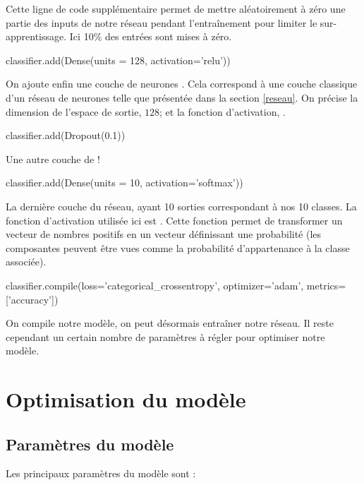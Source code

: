 Cette ligne de code supplémentaire permet de mettre aléatoirement à zéro une partie des 
inputs de notre réseau pendant l'entraînement pour limiter le sur-apprentissage. Ici 10\%
des entrées sont mises à zéro.

\begin{codeblock}
classifier.add(Dense(units = 128, activation='relu'))
\end{codeblock}

On ajoute enfin une couche de neurones . 
Cela correspond à une couche classique d'un réseau de neurones telle que présentée 
dans la section \ref{reseau}. 
On précise la dimension de l'espace de sortie, $128$; et la fonction 
d'activation, . 

\begin{codeblock}
classifier.add(Dropout(0.1)) 
\end{codeblock}

Une autre couche de  !


\begin{codeblock}
classifier.add(Dense(units = 10, activation='softmax'))
\end{codeblock}

La dernière couche du réseau, ayant 10 sorties correspondant à nos 10 classes. 
La fonction d'activation utilisée ici est . 
Cette fonction permet de transformer un vecteur de nombres positifs en 
un vecteur définissant une probabilité (les composantes peuvent être 
vues comme la probabilité d'appartenance à la classe associée).
    
	
\begin{codeblock}
classifier.compile(loss='categorical_crossentropy', optimizer='adam', metrics=['accuracy'])
\end{codeblock}

On compile notre modèle, on peut désormais entraîner notre réseau. 
Il reste cependant un certain nombre de paramètres à régler pour optimiser notre modèle.

\section{Optimisation du modèle}

\subsection{Paramètres du modèle}

Les principaux paramètres du modèle sont :

